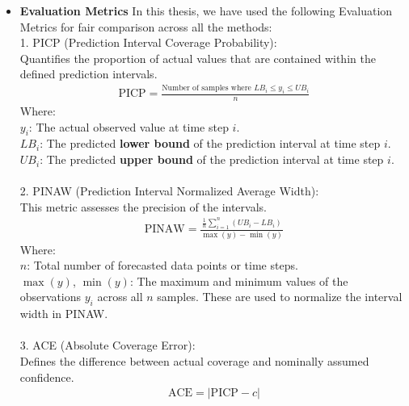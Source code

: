 \begin{itemize}
    \item \textbf{Evaluation Metrics}
    In this thesis, we have used the following Evaluation Metrics for fair comparison across all the methods:\\
    1. PICP (Prediction Interval Coverage Probability):\\
    Quantifies the proportion of actual values that are contained within the defined prediction intervals.
    \begin{equation}
    \begin{aligned}
    \text{PICP} = \frac{\text{Number of samples where } LB_i \leq y_i \leq UB_i}{n}
    \end{aligned}
    \label{Equation 1}
    \end{equation}
    Where:\\ 
    $y_i$: The actual observed value at time step $i$.\\
    $LB_i$: The predicted \textbf{lower bound} of the prediction interval at time step $i$.\\
    $UB_i$: The predicted \textbf{upper bound} of the prediction interval at time step $i$.\\ \\
    2. PINAW (Prediction Interval Normalized Average Width):\\
    This metric assesses the precision of the intervals.
    \begin{equation}
    \begin{aligned}
    \text{PINAW} = \frac{\frac{1}{n} \sum_{i=1}^n (UB_i - LB_i)}{\max(y) - \min(y)}
    \end{aligned}
    \label{Equation 2}
    \end{equation}
    Where:\\ 
    $n$: Total number of forecasted data points or time steps.\\
    $\max(y)$, $\min(y)$: The maximum and minimum values of the observations $y_i$ across all $n$ samples. These are used to normalize the interval width in PINAW.
    \\ \\
    3. ACE (Absolute Coverage Error):\\
    Defines the difference between actual coverage and nominally assumed confidence.
    \begin{equation}
    \begin{aligned}
    \text{ACE} = |\text{PICP} - c|
    \end{aligned}
    \label{Equation 3}
    \end{equation}

\end{itemize}
